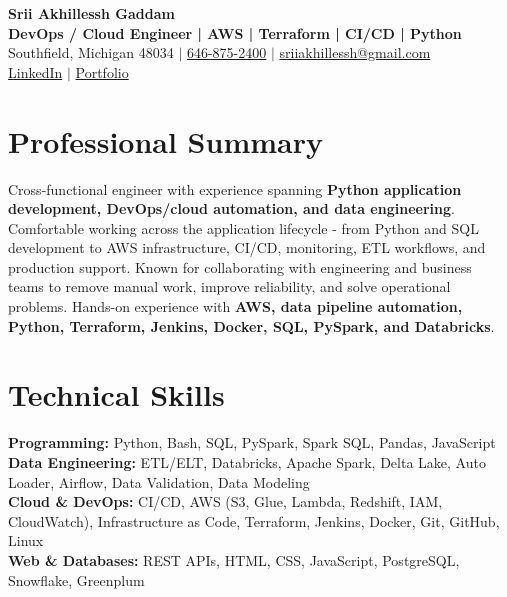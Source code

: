 \documentclass[letterpaper,10pt]{article}
\begin{document}
\fontsize{9.35pt}{10.45pt}\selectfont

\begin{center}
    {\LARGE \textbf{Srii Akhillessh Gaddam}} \\[-1pt]
    \textbf{DevOps / Cloud Engineer | AWS | Terraform | CI/CD | Python} \\[2pt]
    Southfield, Michigan 48034 $|$
    \href{tel:6468752400}{646-875-2400} $|$
    \href{mailto:sriiakhillessh@gmail.com}{sriiakhillessh@gmail.com} \\[1pt]
    \href{https://www.linkedin.com/in/srii-akhiilessh-gaddam-b48668191/}{LinkedIn} $|$
    \href{https://sriiakhillesshg.github.io/portfolio/}{Portfolio}
\end{center}
\vspace{-8pt}

\section{Professional Summary}
\small{Cross-functional engineer with experience spanning \textbf{Python application development, DevOps/cloud automation, and data engineering}. Comfortable working across the application lifecycle - from Python and SQL development to AWS infrastructure, CI/CD, monitoring, ETL workflows, and production support. Known for collaborating with engineering and business teams to remove manual work, improve reliability, and solve operational problems. Hands-on experience with \textbf{AWS, data pipeline automation, Python, Terraform, Jenkins, Docker, SQL, PySpark, and Databricks}.}

\section{Technical Skills}
\small{
\textbf{Programming:} Python, Bash, SQL, PySpark, Spark SQL, Pandas, JavaScript \\
\textbf{Data Engineering:} ETL/ELT, Databricks, Apache Spark, Delta Lake, Auto Loader, Airflow, Data Validation, Data Modeling \\
\textbf{Cloud \& DevOps:} CI/CD, AWS (S3, Glue, Lambda, Redshift, IAM, CloudWatch), Infrastructure as Code, Terraform, Jenkins, Docker, Git, GitHub, Linux \\
\textbf{Web \& Databases:} REST APIs, HTML, CSS, JavaScript, PostgreSQL, Snowflake, Greenplum
}
\end{document}

